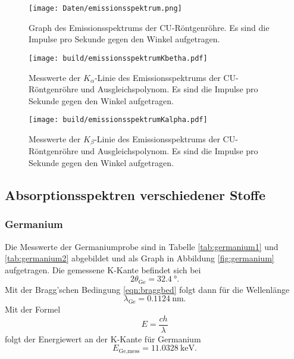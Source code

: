 \begin{figure}
  \centering
  \texttt{[image: Daten/emissionsspektrum.png]}
  \caption{Graph des Emissionsspektrums der CU-Röntgenröhre. Es sind die
  Impulse pro Sekunde gegen den Winkel aufgetragen.}
  \label{fig:emission}
\end{figure}

\begin{figure}
  \centering
  \texttt{[image: build/emissionsspektrumKbetha.pdf]}
  \caption{Messwerte der $K_\alpha$-Linie des Emissionsspektrums der
  CU-Röntgenröhre und Ausgleichspolynom. Es sind die
  Impulse pro Sekunde gegen den Winkel aufgetragen.}
  \label{fig:emissionkalpha}
\end{figure}

\begin{figure}
  \centering
  \texttt{[image: build/emissionsspektrumKalpha.pdf]}
  \caption{Messwerte der $K_\beta$-Linie des Emissionsspektrums der
  CU-Röntgenröhre und Ausgleichspolynom. Es sind die Impulse pro Sekunde
  gegen den Winkel aufgetragen.}
  \label{fig:emissionkbeta}
\end{figure}

\subsection{Absorptionsspektren verschiedener Stoffe}

\subsubsection{Germanium}

Die Messwerte der Germaniumprobe sind in Tabelle \ref{tab:germanium1} und
\ref{tab:germanium2} abgebildet
und als Graph in Abbildung \ref{fig:germanium} aufgetragen.
Die gemessene K-Kante befindet sich bei
\begin{equation}
  2\theta_\text{Ge} = \SI{32.4}{\degree}.
\end{equation}
Mit der Bragg'schen Bedingung \eqref{eqn:braggbed} folgt dann für die
Wellenlänge
\begin{equation}
  \lambda_\text{Ge} = \SI{0.1124}{\nano\meter}.
\end{equation}
Mit der Formel
\begin{equation}
  E = \frac{c h}{\lambda}
  \label{eqn:energielambda}
\end{equation}
folgt der Energiewert an der K-Kante für Germanium
\begin{equation}
  E_\text{Ge,mess} = \SI{11.0328}{\kilo\electronvolt}.
\end{equation}

